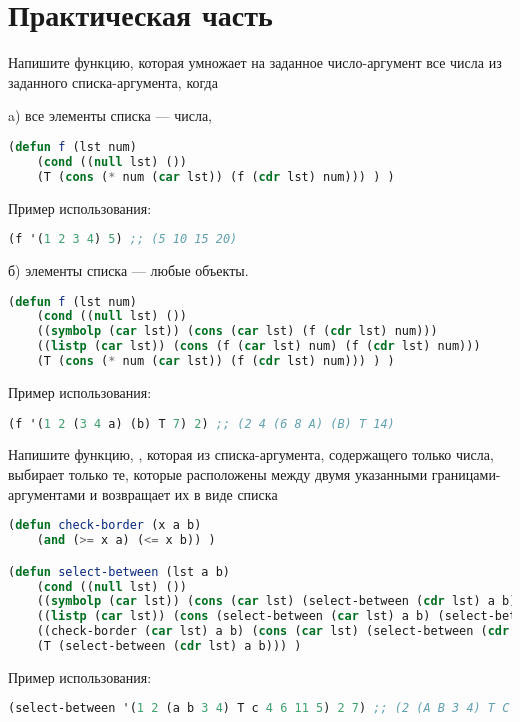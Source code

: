 \documentclass[a4paper,oneside,12pt]{extreport}
\begin{document}


\section*{Практическая часть}

\begin{task}
    Напишите функцию, которая умножает на заданное число-аргумент все числа из заданного списка-аргумента, когда
	
    a) все элементы списка — числа,
    \begin{lstlisting}[language=Lisp]
(defun f (lst num)
    (cond ((null lst) ())
    (T (cons (* num (car lst)) (f (cdr lst) num))) ) )
\end{lstlisting}

    Пример использования:
    \begin{lstlisting}[language=Lisp]    
(f '(1 2 3 4) 5) ;; (5 10 15 20)
    \end{lstlisting}

    б) элементы списка — любые объекты.
    \begin{lstlisting}[language=Lisp]
(defun f (lst num)
    (cond ((null lst) ())
    ((symbolp (car lst)) (cons (car lst) (f (cdr lst) num)))
    ((listp (car lst)) (cons (f (car lst) num) (f (cdr lst) num)))
    (T (cons (* num (car lst)) (f (cdr lst) num))) ) )
    \end{lstlisting}

    Пример использования:
    \begin{lstlisting}[language=Lisp]    
(f '(1 2 (3 4 a) (b) T 7) 2) ;; (2 4 (6 8 A) (B) T 14)
    \end{lstlisting}
\end{task}

\begin{task}
    Напишите функцию, , которая из списка-аргумента,
	содержащего только числа, выбирает только те, которые расположены между
    двумя указанными границами-аргументами и возвращает их в виде списка

    \begin{lstlisting}[language=Lisp]
(defun check-border (x a b)
    (and (>= x a) (<= x b)) )

(defun select-between (lst a b)
	(cond ((null lst) ())
	((symbolp (car lst)) (cons (car lst) (select-between (cdr lst) a b)))
	((listp (car lst)) (cons (select-between (car lst) a b) (select-between (cdr lst) a b)))
	((check-border (car lst) a b) (cons (car lst) (select-between (cdr lst) a b)))
	(T (select-between (cdr lst) a b))) )
    \end{lstlisting}

    Пример использования:
    \begin{lstlisting}[language=Lisp]    
(select-between '(1 2 (a b 3 4) T c 4 6 11 5) 2 7) ;; (2 (A B 3 4) T C 4 6 5)
    \end{lstlisting}
\end{task}
\end{document}
